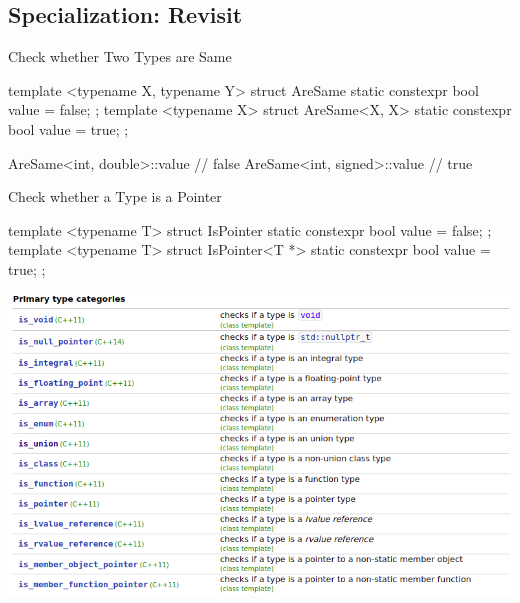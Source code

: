 \subsection{Specialization: Revisit}

\begin{frame}[fragile]{Check whether Two Types are Same}
    \begin{cpp}
template <typename X, typename Y>
struct AreSame {
  static constexpr bool value = false;
};
template <typename X>
struct AreSame<X, X> {
  static constexpr bool value = true;
};

AreSame<int, double>::value // false
AreSame<int, signed>::value // true
    \end{cpp}
\end{frame}

\begin{frame}[fragile]{Check whether a Type is a Pointer}
    \begin{cpp}
template <typename T>
struct IsPointer {
  static constexpr bool value = false;
};
template <typename T>
struct IsPointer<T *> {
  static constexpr bool value = true;
};
    \end{cpp}
\end{frame}

\begin{frame}{}
    \begin{center}
        \includegraphics[width = \textwidth]{img/typetraits1.png}
    \end{center}
\end{frame}


